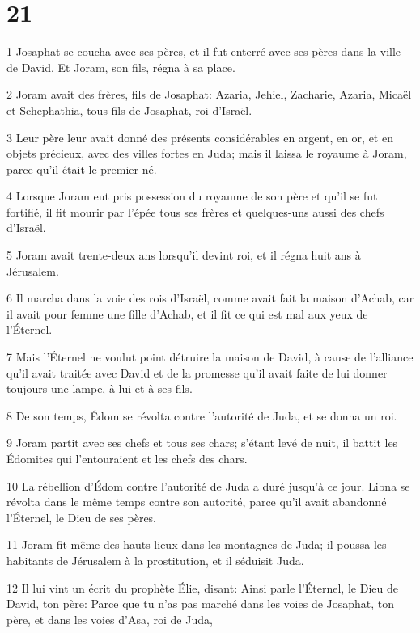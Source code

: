 \chapter{21}

\par 1 Josaphat se coucha avec ses pères, et il fut enterré avec ses pères dans la ville de David. Et Joram, son fils, régna à sa place.
\par 2 Joram avait des frères, fils de Josaphat: Azaria, Jehiel, Zacharie, Azaria, Micaël et Schephathia, tous fils de Josaphat, roi d'Israël.
\par 3 Leur père leur avait donné des présents considérables en argent, en or, et en objets précieux, avec des villes fortes en Juda; mais il laissa le royaume à Joram, parce qu'il était le premier-né.
\par 4 Lorsque Joram eut pris possession du royaume de son père et qu'il se fut fortifié, il fit mourir par l'épée tous ses frères et quelques-uns aussi des chefs d'Israël.
\par 5 Joram avait trente-deux ans lorsqu'il devint roi, et il régna huit ans à Jérusalem.
\par 6 Il marcha dans la voie des rois d'Israël, comme avait fait la maison d'Achab, car il avait pour femme une fille d'Achab, et il fit ce qui est mal aux yeux de l'Éternel.
\par 7 Mais l'Éternel ne voulut point détruire la maison de David, à cause de l'alliance qu'il avait traitée avec David et de la promesse qu'il avait faite de lui donner toujours une lampe, à lui et à ses fils.
\par 8 De son temps, Édom se révolta contre l'autorité de Juda, et se donna un roi.
\par 9 Joram partit avec ses chefs et tous ses chars; s'étant levé de nuit, il battit les Édomites qui l'entouraient et les chefs des chars.
\par 10 La rébellion d'Édom contre l'autorité de Juda a duré jusqu'à ce jour. Libna se révolta dans le même temps contre son autorité, parce qu'il avait abandonné l'Éternel, le Dieu de ses pères.
\par 11 Joram fit même des hauts lieux dans les montagnes de Juda; il poussa les habitants de Jérusalem à la prostitution, et il séduisit Juda.
\par 12 Il lui vint un écrit du prophète Élie, disant: Ainsi parle l'Éternel, le Dieu de David, ton père: Parce que tu n'as pas marché dans les voies de Josaphat, ton père, et dans les voies d'Asa, roi de Juda,
